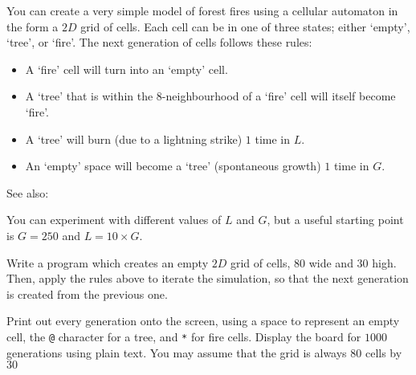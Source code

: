 
You can create a very simple model of forest fires using 
a cellular automaton in the form a $2D$ grid of cells.
Each cell can be in one of three states; either `empty', `tree', or `fire'.
The next generation of cells follows these rules:
\begin{itemize}
\item A `fire' cell will turn into an `empty' cell.
\item A `tree' that is within the 8-neighbourhood of a `fire' cell will itself become `fire'.
\item A `tree' will burn (due to a lightning strike) $1$ time in $L$.
\item An `empty' space will become a `tree' (spontaneous growth) $1$ time in $G$.
\end{itemize}
\noindent See also:\\

\noindent You can experiment with different values of $L$ and $G$, but
a useful starting point is $G=250$ and $L=10 \times G$.

\begin{exercise}
\label{ex:forestf}
Write a program which creates an empty $2D$ grid of cells, $80$ wide and
$30$ high.
Then, apply the rules above to iterate the simulation, so that the next generation
is created from the previous one.

Print out every generation onto the screen, using a space to represent an empty cell,
the \verb^@^ character for a tree, and \verb^*^ for fire cells.
Display the board for $1000$ generations using plain text.
You may assume that the grid is always $80$ cells by $30$

\end{exercise}
